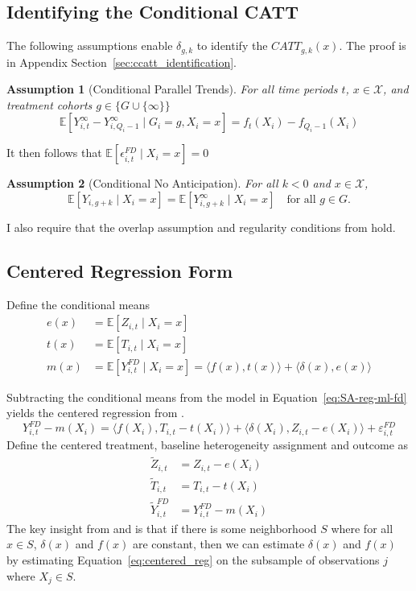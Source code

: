 \documentclass[12pt,notitlepage]{article}
\newcommand{\E}{\mathbb{E}}
\renewcommand{\eqref}[1]{Equation~\ref{#1}}
\newtheorem{assumption}{Assumption}
\begin{document}
\subsection{Identifying the Conditional CATT}
The following assumptions enable $\delta_{g,k}$ to identify the $CATT_{g, k}(x)$. 
The proof is in Appendix Section~\ref{sec:ccatt_identification}.


\begin{assumption}[Conditional Parallel Trends]\label{ass:parallel_trends_cond}
For all time periods $t$, $x \in \mathcal{X}$, and treatment cohorts $g \in \{G \cup \{\infty\}\}$
\[
\E[Y_{i,t}^{\infty} - Y_{i,Q_i - 1}^{\infty}\mid G_i=g, X_i = x] = f_t(X_i) - f_{Q_i - 1}(X_i) 
\]
\end{assumption}
It then follows that $ \E[\epsilon_{i, t}^{FD}  \mid X_i = x] = 0$
\begin{assumption}[Conditional No Anticipation]\label{ass:no_ant_cond}
For all $k<0$ and $x \in \mathcal{X}$,
\[
\E[Y_{i,g+k} \mid X_i = x] = \E[Y_{i,g+k}^\infty \mid X_i = x] 
\quad \text{for all } g \in G.
\]
\end{assumption}
I also require that the overlap assumption and regularity conditions from \cite{athey_generalized_2019} hold. 
\subsection{Centered Regression Form} \label{sec:estimation_framework}
Define the conditional means
\begin{align*}
e(x) &= \E[Z_{i,t}\mid X_i=x] \\
t(x) &= \E[T_{i,t}\mid X_i=x] \\
m(x) &= \E[Y_{i,t}^{FD} \mid X_i=x]  = \langle f(x), t(x)\rangle  + \langle \delta(x), e(x)\rangle 
\end{align*}

Subtracting the conditional means from the model in \eqref{eq:SA-reg-ml-fd} yields the centered regression from \cite{robinson_root-n-consistent_1988}. 
\begin{equation} \label{eq:centered_reg}
Y_{i,t}^{FD} - m(X_i) = \langle f(X_i), T_{i, t} - t(X_i)\rangle  + \langle \delta(X_i), Z_{i, t} - e(X_i)\rangle  + \varepsilon_{i,t}^{FD} 
\end{equation}
Define the centered treatment, baseline heterogeneity assignment and outcome as
\begin{align*}
    \widetilde{Z}_{i,t} &= Z_{i, t} - e(X_i)\\
    \widetilde{T}_{i,t} &= T_{i,t} - t(X_i)\\
    \widetilde{Y}_{i,t}^{FD} &= Y_{i,t}^{FD} - m(X_i)
\end{align*}
The key insight from \cite{robinson_root-n-consistent_1988} and \cite{athey_generalized_2019} is that if there is some neighborhood $S$ where for all $x \in S$, $\delta(x)$ and $f(x)$ are constant, then we can estimate $\delta(x)$ and $f(x)$ by estimating \eqref{eq:centered_reg} on the subsample of observations $j$ where $X_j \in S$.
\end{document}
